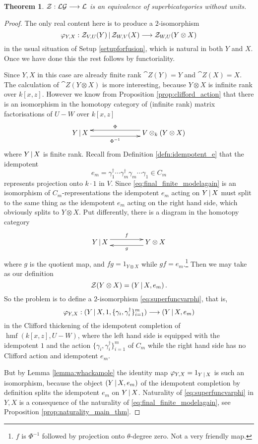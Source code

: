 \documentclass[english,letter paper,12pt,leqno]{article}
\newtheorem{theorem}{Theorem}[section]
\theoremstyle{example}
\numberwithin{equation}{section}
\def\LG{\mathcal{LG}}
\def\be{\begin{equation}}
\def\ee{\end{equation}}
\DeclareMathOperator{\hmf}{hmf}
\begin{document}
\begin{theorem} $\cat{Z}: \LG \lto \cat{L}$ is an equivalence of superbicategories without units.
\end{theorem}
\begin{proof}
The only real content here is to produce a $2$-isomorphism
\be\label{eq:superfuncvarphi}
\varphi_{Y,X}: \cat{Z}_{V,U}(Y) \l \cat{Z}_{W,V}(X) \lto \cat{Z}_{W,U}( Y \otimes X )
\ee
in the usual situation of Setup \ref{setupforfusion}, which is natural in both $Y$ and $X$. Once we have done this the rest follows by functoriality.

Since $Y,X$ in this case are already finite rank $\cat{Z}(Y) = Y$ and $\cat{Z}(X) = X$.  The calculation of $\cat{Z}( Y \otimes X )$ is more interesting, because $Y \otimes X$ is infinite rank over $k[x,z]$. However we know from Proposition \ref{prop:clifford_action} that there is an isomorphism in the homotopy category of (infinite rank) matrix factorisations of $U - W$ over $k[x,z]$
\begin{equation}\label{eq:final_finite_modelagain}
\xymatrix@C+4pc{
Y \l X \ar@<-1ex>[r]_-{\Phi^{-1}} & V \otimes_k ( Y \otimes X )\ar@<-1ex>[l]_-{\Phi}
}
\end{equation}
where $Y \,|\, X$ is finite rank. Recall from Definition \ref{defn:idempotent_e} that the idempotent
\[
e_m = \gamma_1^\dagger \cdots \gamma_m^\dagger \gamma_m \cdots \gamma_1 \in C_m
\]
represents projection onto $k \cdot 1$ in $V$. Since \eqref{eq:final_finite_modelagain} is an isomorphism of $C_m$-representations the idempotent $e_m$ acting on $Y \,|\, X$ must split to the same thing as the idempotent $e_m$ acting on the right hand side, which obviously splits to $Y \otimes X$. Put differently, there is a diagram in the homotopy category
\[
\xymatrix@C+2pc{
Y \l X \ar@<1ex>[r]^-{f} & Y \otimes X \ar@<1ex>[l]^-{g}
}
\]
where $g$ is the quotient map, and $f g = 1_{Y \otimes X}$ while $g f = e_m$.\footnote{$f$ is $\Phi^{-1}$ followed by projection onto $\theta$-degree zero. Not a very friendly map.} Then we may take as our definition
\[
\mathcal{Z}( Y \otimes X ) = (Y \,|\, X, e_m)\,.
\]
So the problem is to define a $2$-isomorphism \eqref{eq:superfuncvarphi}, that is,
\[
\varphi_{Y,X}: (Y \,|\, X, 1, \{ \gamma_i, \gamma_i^\dagger \}_{i=1}^m) \longrightarrow (Y \,|\, X, e_m)
\]
in the Clifford thickening of the idempotent completion of $\hmf(k[x,z],U - W)$, where the left hand side is equipped with the idempotent $1$ and the action $\{ \gamma_i, \gamma_i^\dagger \}_{i=1}^m$ of $C_m$ while the right hand side has no Clifford action and idempotent $e_m$.

But by Lemma \ref{lemma:whackamole} the identity map $\varphi_{Y,X} = 1_{Y \,|\, X}$ is such an isomorphism, because the object $(Y \,|\, X, e_m)$ of the idempotent completion by definition splits the idempotent $e_m$ on $Y \,|\, X$. Naturality of \eqref{eq:superfuncvarphi} in $Y,X$ is a consequence of the naturality of \eqref{eq:final_finite_modelagain}, see Proposition \ref{prop:naturality_main_thm}.
\end{proof}
\end{document}
